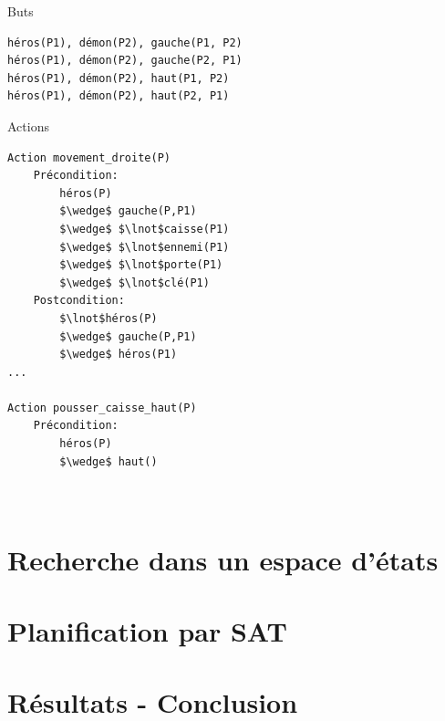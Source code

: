 Buts 
\begin{lstlisting}
héros(P1), démon(P2), gauche(P1, P2) 
héros(P1), démon(P2), gauche(P2, P1) 
héros(P1), démon(P2), haut(P1, P2) 
héros(P1), démon(P2), haut(P2, P1) 
\end{lstlisting}

Actions
\begin{lstlisting}
Action movement_droite(P)
    Précondition: 
    	héros(P) 
		$\wedge$ gauche(P,P1)
        $\wedge$ $\lnot$caisse(P1)
        $\wedge$ $\lnot$ennemi(P1)
        $\wedge$ $\lnot$porte(P1)
        $\wedge$ $\lnot$clé(P1)
    Postcondition: 
    	$\lnot$héros(P)
        $\wedge$ gauche(P,P1)
        $\wedge$ héros(P1)
...

Action pousser_caisse_haut(P)
	Précondition:
		héros(P)
		$\wedge$ haut()
		
		
\end{lstlisting}




\section{Recherche dans un espace d'états}
\section{Planification par SAT}

\section*{Résultats - Conclusion}